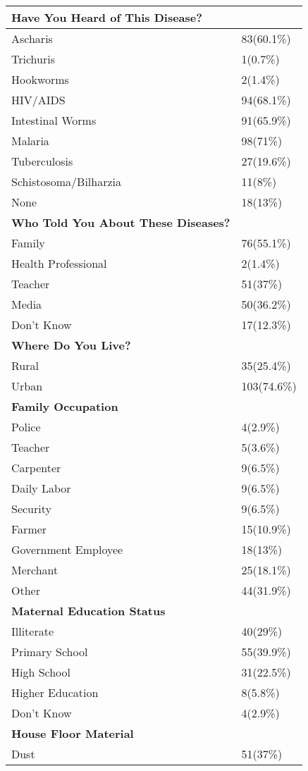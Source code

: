 \documentclass[6pt,letterpaper]{article}
\begin{document}
\begin{tabular}{|l  l|}
\hline
\textbf{Have You Heard of This Disease?} \\
\hline 
Ascharis & 83(60.1\%) \\
Trichuris & 1(0.7\%) \\
Hookworms & 2(1.4\%) \\
HIV/AIDS & 94(68.1\%) \\
Intestinal Worms & 91(65.9\%) \\
Malaria & 98(71\%) \\
Tuberculosis & 27(19.6\%) \\
Schistosoma/Bilharzia & 11(8\%) \\
None & 18(13\%) \\
\hline
\textbf{Who Told You About These Diseases?} \\
\hline
Family & 76(55.1\%) \\
Health Professional & 2(1.4\%) \\
Teacher & 51(37\%) \\
Media & 50(36.2\%) \\
Don't Know & 17(12.3\%) \\
\hline
\textbf{Where Do You Live?} \\
\hline
Rural & 35(25.4\%) \\
Urban & 103(74.6\%) \\
\hline
\textbf{Family Occupation} & \\
\hline
Police & 4(2.9\%) \\
Teacher & 5(3.6\%) \\
Carpenter & 9(6.5\%) \\
Daily Labor & 9(6.5\%) \\
Security & 9(6.5\%) \\
Farmer & 15(10.9\%) \\
Government Employee & 18(13\%) \\
Merchant & 25(18.1\%) \\
Other & 44(31.9\%) \\
\hline
\textbf{Maternal Education Status} & \\
\hline
Illiterate & 40(29\%) \\
Primary School & 55(39.9\%) \\
High School & 31(22.5\%) \\
Higher Education & 8(5.8\%) \\
Don't Know & 4(2.9\%) \\
\hline
\textbf{House Floor Material} \\
\hline
Dust & 51(37\%) \\

\end{tabular}
\end{document}
